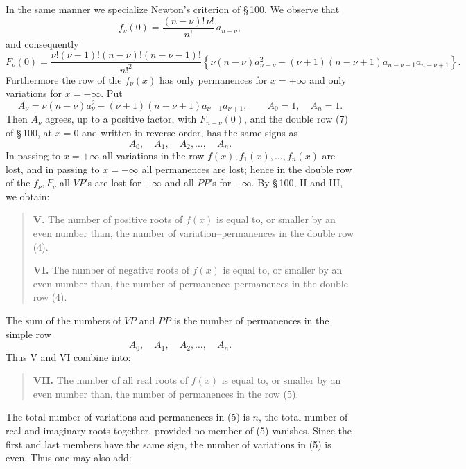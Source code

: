 \documentclass[11pt]{article}
\begin{document}
In the same manner we specialize Newton's criterion of \S\,100. We observe that
\[
        f_\nu(0)=\frac{(n-\nu)!\,\nu!}{n!}\,a_{n-\nu},
\]
and consequently
\[
F_\nu(0)=
\frac{\nu!(\nu-1)!(n-\nu)!(n-\nu-1)!}{n!^2}
\left\{\nu(n-\nu)a_{n-\nu}^2
-(\nu+1)(n-\nu+1)a_{n-\nu-1}a_{n-\nu+1}\right\}.
\]
Furthermore the row of the $f_\nu(x)$ has only permanences for $x=+\infty$ and only variations for $x=-\infty$. Put
\begin{equation}
        A_\nu=\nu(n-\nu)a_\nu^2-(\nu+1)(n-\nu+1)a_{\nu-1}a_{\nu+1},
        \qquad A_0=1,\quad A_n=1.
\tag{3}
\end{equation}
Then $A_\nu$ agrees, up to a positive factor, with $F_{n-\nu}(0)$, and the double row (7) of \S\,100, at $x=0$ and written in reverse order, has the same signs as
\begin{equation}
        A_0,\quad A_1,\quad A_2,\ldots,\quad A_n.
\tag{4}
\end{equation}
In passing to $x=+\infty$ all variations in the row $f(x),f_1(x),\ldots,f_n(x)$ are lost, and in passing to $x=-\infty$ all permanences are lost; hence in the double row of the $f_\nu,F_\nu$ all $VP$'s are lost for $+\infty$ and all $PP$'s for $-\infty$. By \S\,100, II and III, we obtain:

\begin{quote}
\textbf{V.} The number of positive roots of $f(x)$ is equal to, or smaller by an even number than, the number of variation--permanences in the double row (4).

\textbf{VI.} The number of negative roots of $f(x)$ is equal to, or smaller by an even number than, the number of permanence--permanences in the double row (4).
\end{quote}

The sum of the numbers of $VP$ and $PP$ is the number of permanences in the simple row
\begin{equation}
        A_0,\quad A_1,\quad A_2,\ldots,\quad A_n.
\tag{5}
\end{equation}
Thus V and VI combine into:

\begin{quote}
\textbf{VII.} The number of all real roots of $f(x)$ is equal to, or smaller by an even number than, the number of permanences in the row (5).
\end{quote}

The total number of variations and permanences in (5) is $n$, the total number of real and imaginary roots together, provided no member of (5) vanishes. Since the first and last members have the same sign, the number of variations in (5) is even. Thus one may also add:
\end{document}
